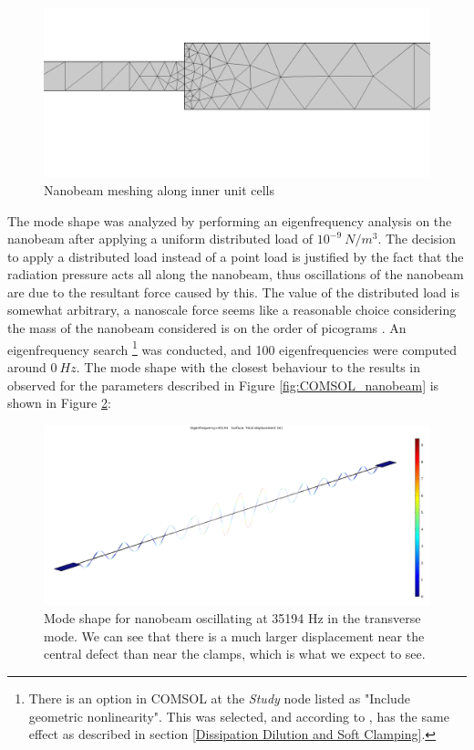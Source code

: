 \documentclass[%
 reprint,
nofootinbib,
 amsmath,amssymb,
 aps,
]{revtex4-2}
\begin{document}
\begin{figure}[H]
    \centering
    \includegraphics[width = \columnwidth]{nanobeam_inner_mesh.png}
    \caption{Nanobeam meshing along inner unit cells}
    \label{fig:nanobeam_inner_mesh}
\end{figure}

The mode shape was analyzed by performing an eigenfrequency analysis on the nanobeam after applying a uniform distributed load of $10^{-9} \ N/m^3$. The decision to apply a distributed load instead of a point load is justified by the fact that the radiation pressure acts all along the nanobeam, thus oscillations of the nanobeam are due to the resultant force caused by this. The value of the distributed load is somewhat arbitrary, a nanoscale force seems like a reasonable choice considering the mass of the nanobeam considered is on the order of picograms \cite{ghadimi_main_paper}. An eigenfrequency search \footnote{There is an option in COMSOL at the \textit{Study} node listed as "Include geometric nonlinearity". This was selected, and according to \cite{what_is_geometric_nonlinearity}, has the same effect as described in section \ref{Dissipation Dilution and Soft Clamping}.} was conducted, and 100 eigenfrequencies were computed around $0 \ Hz$. The mode shape with the closest behaviour to the results in \cite{ghadimi_main_paper} observed for the parameters described in Figure \ref{fig:COMSOL_nanobeam} is shown in Figure \ref{fig:Nanobeam_mode_shape_35194Hz}:

\begin{figure}[H]\label{Mode Shape}
    \centering
    \includegraphics[width = \columnwidth]{Nanobeam_mode_shape_35194Hz.png}
    \caption{Mode shape for nanobeam oscillating at 35194 Hz in the transverse mode. We can see that there is a much larger displacement near the central defect than near the clamps, which is what we expect to see.}
    \label{fig:Nanobeam_mode_shape_35194Hz}
\end{figure}
\end{document}
